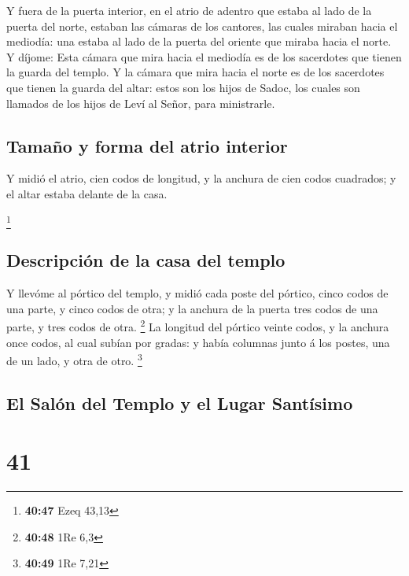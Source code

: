  Y fuera de la puerta interior, en el atrio de adentro
que estaba al lado de la puerta del norte, estaban las cámaras de los
cantores, las cuales miraban hacia el mediodía: una estaba al lado de la
puerta del oriente que miraba hacia el norte.  Y díjome:
Esta cámara que mira hacia el mediodía es de los sacerdotes que tienen
la guarda del templo.  Y la cámara que mira hacia el
norte es de los sacerdotes que tienen la guarda del altar: estos son los
hijos de Sadoc, los cuales son llamados de los hijos de Leví al Señor,
para ministrarle.

\hypertarget{tamauxf1o-y-forma-del-atrio-interior}{%
\subsection{Tamaño y forma del atrio
interior}\label{tamauxf1o-y-forma-del-atrio-interior}}

 Y midió el atrio, cien codos de longitud, y la anchura
de cien codos cuadrados; y el altar estaba delante de la casa.

\footnote{\textbf{40:47} Ezeq 43,13}

\hypertarget{descripciuxf3n-de-la-casa-del-templo}{%
\subsection{Descripción de la casa del
templo}\label{descripciuxf3n-de-la-casa-del-templo}}

 Y llevóme al pórtico del templo, y midió cada poste del
pórtico, cinco codos de una parte, y cinco codos de otra; y la anchura
de la puerta tres codos de una parte, y tres codos de otra. \footnote{\textbf{40:48}
  1Re 6,3}  La longitud del pórtico veinte codos, y la
anchura once codos, al cual subían por gradas: y había columnas junto á
los postes, una de un lado, y otra de otro. \footnote{\textbf{40:49} 1Re
  7,21}

\hypertarget{el-saluxf3n-del-templo-y-el-lugar-santuxedsimo}{%
\subsection{El Salón del Templo y el Lugar
Santísimo}\label{el-saluxf3n-del-templo-y-el-lugar-santuxedsimo}}

\hypertarget{section-40}{%
\section{41}\label{section-40}}

